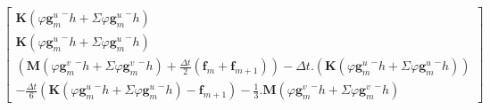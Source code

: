 \documentclass[12pt,a4paper]{report}
\begin{document}
\begin{equation}
\begin{array}{c}
	\begin{bmatrix}	
		  \mathbf{K} (\varphi {\mathbf{g}^u_m}^- h + \Sigma \varphi {\mathbf{g}^u_m}^- h)
		\\ \mathbf{K} (\varphi {\mathbf{g}^u_m}^- h + \Sigma \varphi {\mathbf{g}^u_m}^- h)
		\\ 	\left( \mathbf{M}  (\varphi {\mathbf{g}^v_m}^- h + \Sigma \varphi {\mathbf{g}^v_m}^- h)
		     			+\frac{\Delta t}{2}  (\mathbf{f}_m + \mathbf{f}_{m+1})
			  \right)
			-\Delta t.
			 \left( \mathbf{K}  (\varphi {\mathbf{g}^u_m}^- h + \Sigma \varphi{\mathbf{g}^u_m}^- h)
			  \right)
		\\-\frac{\Delta t}{6}
				\left( \mathbf{K}  (\varphi {\mathbf{g}^u_m}^- h + \Sigma \varphi {\mathbf{g}^u_m}^- h)
						-\mathbf{f}_{m+1}
				\right)
					  
			- \frac{1}{3} .  \mathbf{M} (\varphi {\mathbf{g}^v_m}^- h + \Sigma \varphi {\mathbf{g}^v_m}^- h)
	\end{bmatrix}
\end{array}
\end{equation}
 
\end{document}
